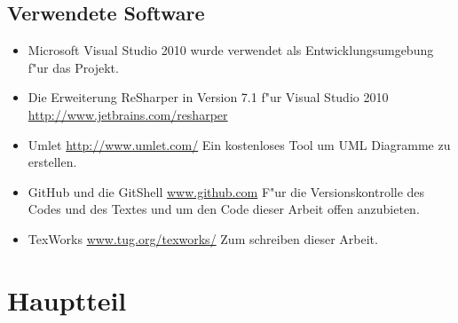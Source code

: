 \documentclass[pagesize, paper=a4, fontsize=12pt,titlepage=true, headings=small, headnosepline, abstractoff, liststotoc, nochapterprefix, plainheadsepline]{scrreprt}
\newcommand{\CSS}{C\texttt{\# }}
\newcommand{\HES}{Half-Edge Datenstruktur }
\begin{document}
	\section {Verwendete Software}
\begin{itemize}
\item Microsoft Visual Studio 2010 \newline wurde verwendet als Entwicklungsumgebung f"ur das Projekt.
\item Die Erweiterung ReSharper in Version 7.1 f"ur Visual Studio 2010 \url{http://www.jetbrains.com/resharper}
\item Umlet \url{http://www.umlet.com/} \newline Ein kostenloses Tool um UML Diagramme zu erstellen.
\item GitHub und die GitShell \url{www.github.com} \newline F"ur die Versionskontrolle des Codes und des Textes und um den Code dieser Arbeit offen anzubieten.
\item TexWorks \url{www.tug.org/texworks/} \newline Zum schreiben dieser Arbeit.
\end{itemize}

\chapter {Hauptteil}
\end{document}
